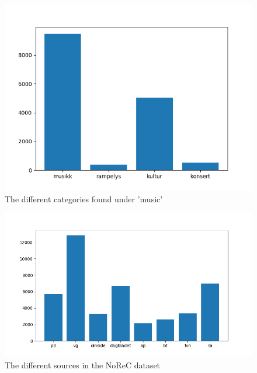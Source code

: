 \begin{figure}[h!]
	\centering
	\includegraphics[scale=0.5]{img/music_categories}
	\caption{The different categories found under 'music'}
	\label{fig:music}
\end{figure}%
\begin{figure}[h!]
	\centering
	\includegraphics[scale=0.5]{img/src_dist_new}
	\caption{The different sources in the NoReC dataset}
	\label{fig:sources}
\end{figure}%

